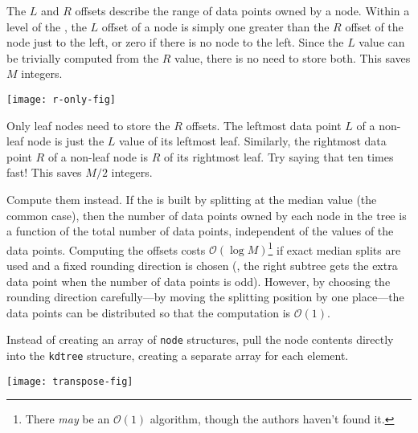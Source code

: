\label{trick:ronly}

The $L$ and $R$ offsets describe the range of data points owned by a
node.  Within a level of the \kdtree, the $L$ offset of a node is
simply one greater than the $R$ offset of the node just to the left,
or zero if there is no node to the left.  Since the $L$ value can be
trivially computed from the $R$ value, there is no need to store both.
This saves $M$ integers.


\nonumberparagraphs
\begin{center}
  \texttt{[image: r-only-fig]}
\end{center}
\numberparagraphs

Only leaf nodes need to store the $R$ offsets.
The leftmost data point $L$ of a non-leaf node is just the $L$ value of its
leftmost leaf.  Similarly, the rightmost data point $R$ of a non-leaf node is
$R$ of its rightmost leaf.  Try saying that ten times fast!
This saves $M/2$ integers.



\label{trick:noR}
Compute them instead.  If the \kdtree is built by splitting at the
median value (the common case), then the number of data points owned
by each node in the tree is a function of the total number of data
points, independent of the values of the data points.  Computing the
offsets costs $\mathcal{O}(\log M)$\footnote{There {\em may} be an
$\mathcal{O}(1)$ algorithm, though the authors haven't found it.} if
exact median splits are used and a fixed rounding direction is chosen
(\ie, the right subtree gets the extra data point when the number of
data points is odd).  However, by choosing the rounding direction
carefully---by moving the splitting position by one place---the data
points can be distributed so that the computation is $\mathcal{O}(1)$.



\label{trick:transpose}
Instead of creating an array of {\tt node} structures, pull the
node contents directly into the {\tt kdtree} structure, creating a
separate array for each element.

\nonumberparagraphs
\begin{center}
    \texttt{[image: transpose-fig]}
\end{center}
\numberparagraphs

